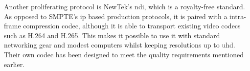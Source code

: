 \documentclass[../main.tex]{subfiles}
\begin{document}
Another proliferating protocol is NewTek's \gls{ndi}, which is a royalty-free standard. As opposed to SMPTE's \gls{ip} based production protocols, it is paired with a intra-frame compression codec, although it is able to transport existing video codecs such as H.264 and H.265. This makes it possible to use it with standard networking gear and modest computers whilst keeping resolutions up to \gls{uhd}. Their own codec has been designed to meet the quality requirements mentioned earlier.\newline

\end{document}
